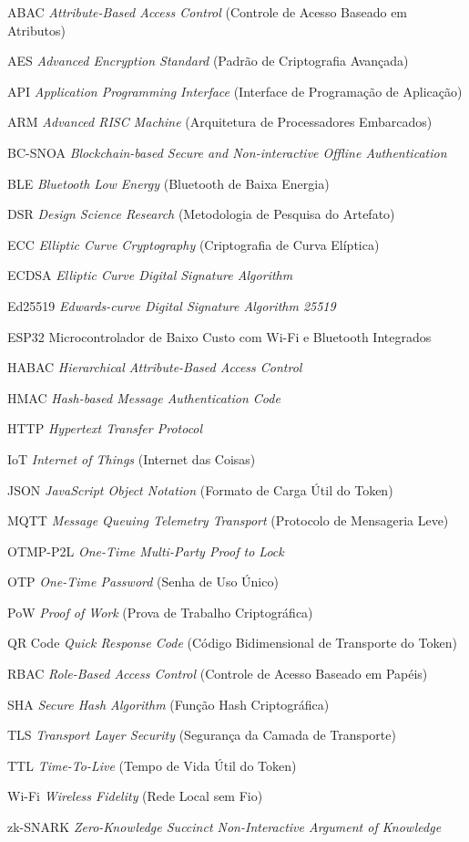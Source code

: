 ﻿\begin{siglas}
  \SingleSpacing
  \setlength{\itemsep}{0.1em}
  \item[ABAC] \textit{Attribute-Based Access Control} (Controle de Acesso Baseado em Atributos)
  \item[AES] \textit{Advanced Encryption Standard} (Padrão de Criptografia Avançada)
  \item[API] \textit{Application Programming Interface} (Interface de Programação de Aplicação)
  \item[ARM] \textit{Advanced RISC Machine} (Arquitetura de Processadores Embarcados)
  \item[BC-SNOA] \textit{Blockchain-based Secure and Non-interactive Offline Authentication}
  \item[BLE] \textit{Bluetooth Low Energy} (Bluetooth de Baixa Energia)
  \item[DSR] \textit{Design Science Research} (Metodologia de Pesquisa do Artefato)
  \item[ECC] \textit{Elliptic Curve Cryptography} (Criptografia de Curva Elíptica)
  \item[ECDSA] \textit{Elliptic Curve Digital Signature Algorithm}
  \item[Ed25519] \textit{Edwards-curve Digital Signature Algorithm 25519}
  \item[ESP32] Microcontrolador de Baixo Custo com Wi-Fi e Bluetooth Integrados
  \item[HABAC] \textit{Hierarchical Attribute-Based Access Control}
  \item[HMAC] \textit{Hash-based Message Authentication Code}
  \item[HTTP] \textit{Hypertext Transfer Protocol}
  \item[IoT] \textit{Internet of Things} (Internet das Coisas)
  \item[JSON] \textit{JavaScript Object Notation} (Formato de Carga Útil do Token)
  \item[MQTT] \textit{Message Queuing Telemetry Transport} (Protocolo de Mensageria Leve)
  \item[OTMP-P2L] \textit{One-Time Multi-Party Proof to Lock}
  \item[OTP] \textit{One-Time Password} (Senha de Uso Único)
  \item[PoW] \textit{Proof of Work} (Prova de Trabalho Criptográfica)
  \item[QR Code] \textit{Quick Response Code} (Código Bidimensional de Transporte do Token)
  \item[RBAC] \textit{Role-Based Access Control} (Controle de Acesso Baseado em Papéis)
  \item[SHA] \textit{Secure Hash Algorithm} (Função Hash Criptográfica)
  \item[TLS] \textit{Transport Layer Security} (Segurança da Camada de Transporte)
  \item[TTL] \textit{Time-To-Live} (Tempo de Vida Útil do Token)
  \item[Wi-Fi] \textit{Wireless Fidelity} (Rede Local sem Fio)
  \item[zk-SNARK] \textit{Zero-Knowledge Succinct Non-Interactive Argument of Knowledge}
\end{siglas}
